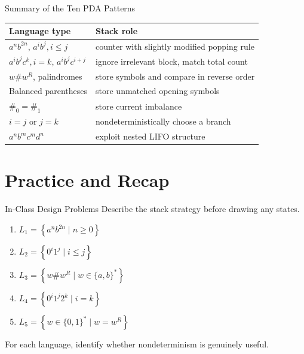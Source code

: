\documentclass[aspectratio=169,10pt]{beamer}
\newcommand{\lang}[1]{\left\{#1\right\}}
\begin{document}
\begin{frame}{Summary of the Ten PDA Patterns}
\small
\centering
\renewcommand{\arraystretch}{1.22}
\begin{tabular}{p{}p{}}
\toprule
\textbf{Language type} & \textbf{Stack role}\\
\midrule
\(a^n b^{2n}\), \(a^i b^j, i\le j\) & counter with slightly modified popping rule\\
\(a^i b^j c^k, i=k\), \(a^i b^j c^{i+j}\) & ignore irrelevant block, match total count\\
\(w\#w^R\), palindromes & store symbols and compare in reverse order\\
Balanced parentheses & store unmatched opening symbols\\
\(\#_0=\#_1\) & store current imbalance\\
\(i=j\) or \(j=k\) & nondeterministically choose a branch\\
\(a^n b^m c^m d^n\) & exploit nested LIFO structure\\
\bottomrule
\end{tabular}
\end{frame}



\section{Practice and Recap}

\begin{frame}{In-Class Design Problems}
Describe the stack strategy before drawing any states.

\begin{enumerate}
    \item $L_1=\lang{a^nb^{2n}\mid n\ge0}$
    \item $L_2=\lang{0^i1^j\mid i\le j}$
    \item $L_3=\lang{w\#w^R\mid w\in\{a,b\}^{*}}$
    \item $L_4=\lang{0^i1^j2^k\mid i=k}$
    \item $L_5=\lang{w\in\{0,1\}^{*}\mid w=w^R}$
\end{enumerate}

\vspace{0.7em}
For each language, identify whether nondeterminism is genuinely useful.
\end{frame}
\end{document}
